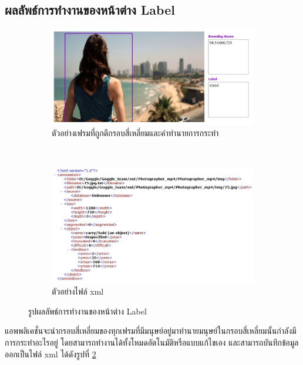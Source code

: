 \subsection*{ผลลัพธ์การทำงานของหน้าต่าง Label}
\begin{figure}[!ht]
    \centering
   \begin{subfigure}[b]{0.65\linewidth}
      \includegraphics[width=\linewidth]{chapter4/images/Result/result_select.jpg}
      \caption{ตัวอย่างเฟรมที่ถูกตีกรอบสี่เหลี่ยมและคำทำนายการกระทำ}
      \label{fig:result_labeled}
    \end{subfigure}
\\
    \begin{subfigure}[b]{0.8\linewidth}
      \includegraphics[width=\linewidth]{chapter4/images/Result/result_select9.jpg}
      \caption{ตัวอย่างไฟล์ xml}
      \label{fig:result_label_xml}
    \end{subfigure}
    \caption{รูปผลลัพธ์การทำงานของหน้าต่าง Label}
    \label{fig:result_label}
  \end{figure}
แอพพลิเคชั่นจะนำกรอบสี่เหลี่ยมของทุกเฟรมที่มีมนุษย์อยู่มาทำนายมนุษย์ในกรอบสี่เหลี่ยมนั้นกำลังมีการกระทำอะไรอยู่ โดยสามารถทำงานได้ทั้งโหมดอัตโนมัติหรือแบบแก้ไขเอง 
และสามารถบันทึกข้อมูลออกเป็นไฟล์ xml ได้ดังรูปที่ \ref{fig:result_label_xml}
